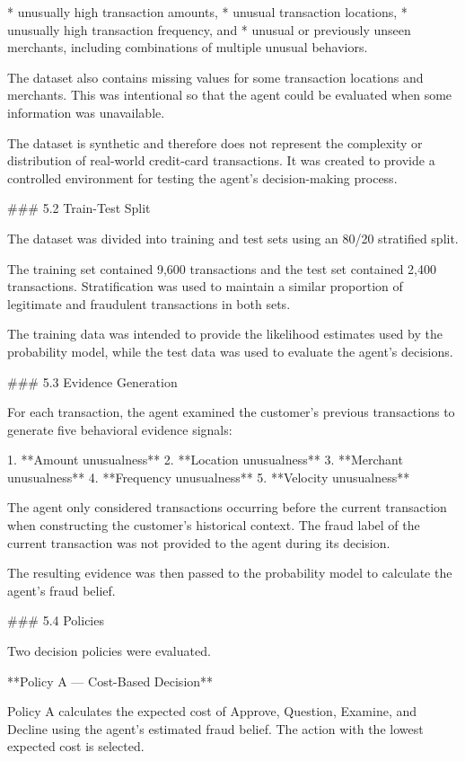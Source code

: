 * unusually high transaction amounts,
* unusual transaction locations,
* unusually high transaction frequency, and
* unusual or previously unseen merchants, including combinations of multiple unusual behaviors.

The dataset also contains missing values for some transaction locations and merchants. This was intentional so that the agent could be evaluated when some information was unavailable.

The dataset is synthetic and therefore does not represent the complexity or distribution of real-world credit-card transactions. It was created to provide a controlled environment for testing the agent's decision-making process.

### 5.2 Train-Test Split

The dataset was divided into training and test sets using an 80/20 stratified split.

The training set contained 9,600 transactions and the test set contained 2,400 transactions. Stratification was used to maintain a similar proportion of legitimate and fraudulent transactions in both sets.

The training data was intended to provide the likelihood estimates used by the probability model, while the test data was used to evaluate the agent's decisions.

### 5.3 Evidence Generation

For each transaction, the agent examined the customer's previous transactions to generate five behavioral evidence signals:

1. **Amount unusualness**
2. **Location unusualness**
3. **Merchant unusualness**
4. **Frequency unusualness**
5. **Velocity unusualness**

The agent only considered transactions occurring before the current transaction when constructing the customer's historical context. The fraud label of the current transaction was not provided to the agent during its decision.

The resulting evidence was then passed to the probability model to calculate the agent's fraud belief.

### 5.4 Policies

Two decision policies were evaluated.

**Policy A — Cost-Based Decision**

Policy A calculates the expected cost of Approve, Question, Examine, and Decline using the agent's estimated fraud belief. The action with the lowest expected cost is selected.

